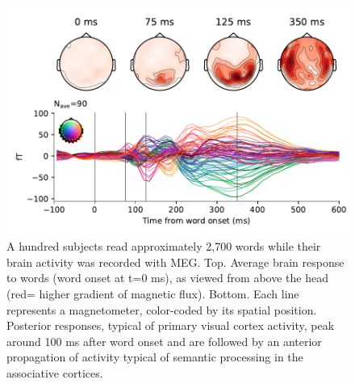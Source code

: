 \begin{figure}[t!]
  \begin{minipage}[c]{0.6\textwidth}
    \includegraphics[width=\textwidth, trim=0cm 0cm 0cm 0cm, clip=True]{figures/meg_evoked.pdf}
  \end{minipage}\hfill
  \begin{minipage}[c]{0.4\textwidth}
    \caption{A hundred subjects read approximately 2,700 words while their
    brain activity was recorded with MEG. Top. Average brain response to words
    (word onset at t=0 ms), as viewed from above the head (red= higher gradient
    of magnetic flux). Bottom. Each line represents a magnetometer, color-coded
    by its spatial position. Posterior responses, typical of primary visual
    cortex activity, peak around 100 ms after word onset and are followed by
    an anterior propagation of activity typical of semantic processing in the
    associative cortices.
    }
    \label{fig:meg_evoked}
  \end{minipage}
\end{figure}


